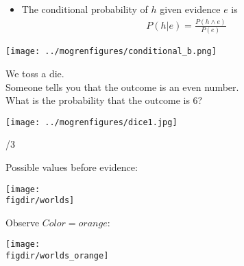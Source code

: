 \documentclass[12pt]{beamer} %
\newcommand{\figdir}{../../figures/ch06}
\begin{document}
\begin{slide}
\begin{itemize}
\item
The conditional probability of $h$ given evidence $e$ is
\begin{eqnarray*}
P(h|e)%
 =\frac{P(h\wedge e)}{P(e)}
\end{eqnarray*}
\end{itemize}

\begin{center}
\texttt{[image: ../mogrenfigures/conditional\_b.png]}
\end{center}
\end{slide}

\begin{slide}

We toss a die.\\
Someone tells you that the outcome is an even number.\\
What is the probability that the outcome is 6?
\begin{center}
\texttt{[image: ../mogrenfigures/dice1.jpg]}
\end{center}
/3
\end{slide}


\begin{slide}
Possible values before evidence:
\begin{center}
\texttt{[image: \\figdir/worlds]}
\end{center}
\pause
Observe $Color=orange$:
\begin{center}
\texttt{[image: \\figdir/worlds\_orange]}
\end{center}
\end{slide}
\end{document}
